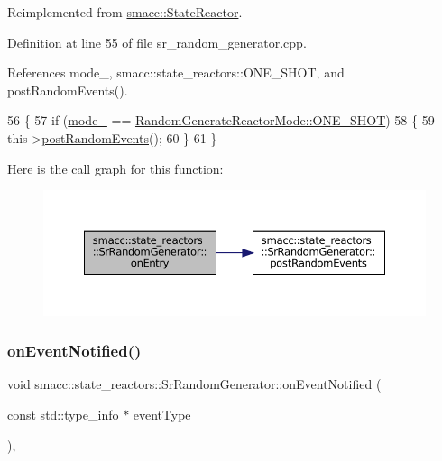 Reimplemented from \hyperlink{classsmacc_1_1StateReactor_a11ed02721fd751b8272540645b88f4a6}{smacc\+::\+State\+Reactor}.



Definition at line 55 of file sr\+\_\+random\+\_\+generator.\+cpp.



References mode\+\_\+, smacc\+::state\+\_\+reactors\+::\+O\+N\+E\+\_\+\+S\+H\+OT, and post\+Random\+Events().


\begin{DoxyCode}
56 \{
57     \textcolor{keywordflow}{if} (\hyperlink{classsmacc_1_1state__reactors_1_1SrRandomGenerator_a10984da2fb51badf4fe6f25861120735}{mode\_} == \hyperlink{namespacesmacc_1_1state__reactors_a038f8e362ad6d35494c940ee4c97a52ea5bc2964599423c796ecf0aaecdc5be9d}{RandomGenerateReactorMode::ONE\_SHOT})
58     \{
59         this->\hyperlink{classsmacc_1_1state__reactors_1_1SrRandomGenerator_a50638c93ca9444fbeecea6e72bc6ac35}{postRandomEvents}();
60     \}
61 \}
\end{DoxyCode}
Here is the call graph for this function\+:
\nopagebreak
\begin{figure}[H]
\begin{center}
\leavevmode
\includegraphics[width=350pt]{classsmacc_1_1state__reactors_1_1SrRandomGenerator_a093fa3de1ca4f84c74cc0cb0f093cb31_cgraph}
\end{center}
\end{figure}
\mbox{\label{classsmacc_1_1state__reactors_1_1SrRandomGenerator_a8635347245b76d17355fe374e854144f}} 
\subsubsection{\texorpdfstring{on\+Event\+Notified()}{onEventNotified()}}
{\footnotesize\ttfamily void smacc\+::state\+\_\+reactors\+::\+Sr\+Random\+Generator\+::on\+Event\+Notified (\begin{DoxyParamCaption}\item[{const std\+::type\+\_\+info $\ast$}]{event\+Type }\end{DoxyParamCaption})\hspace{0.3cm}{\ttfamily [override]}, {\ttfamily [virtual]}}



